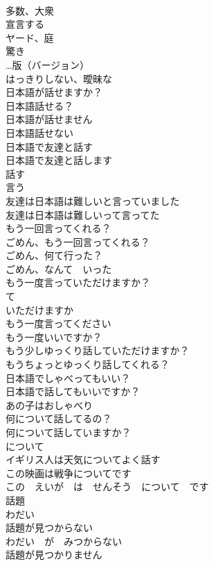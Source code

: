 \documentclass[8pt]{extreport}
\begin{document}
\begin{CJK}{UTF8}{min}
\\	多数、大衆	
\\	宣言する	
\\	ヤード、庭	
\\	驚き	
\\	…版（バージョン）	
\\	はっきりしない、曖昧な	
\\	日本語が話せますか？	
\\	日本語話せる？	
\\	日本語が話せません	
\\	日本語話せない	
\\	日本語で友達と話す	
\\	日本語で友達と話します	
\\	話す	
\\	言う	
\\	友達は日本語は難しいと言っていました	
\\	友達は日本語は難しいって言ってた	
\\	もう一回言ってくれる？	
\\	ごめん、もう一回言ってくれる？	
\\	ごめん、何て行った？	
\\	ごめん、なんて　いった
\\	もう一度言っていただけますか？	
\\	て
\\	いただけますか 
\\	もう一度言ってください	
\\	もう一度いいですか？	
\\	もう少しゆっくり話していただけますか？	
\\	もうちょっとゆっくり話してくれる？	
\\	日本語でしゃべってもいい？	
\\	日本語で話してもいいですか？	
\\	あの子はおしゃべり	
\\	何について話してるの？	
\\	何について話していますか？	
\\	について 
\\	イギリス人は天気についてよく話す	
\\	この映画は戦争についてです	
\\	この　えいが　は　せんそう　について　です
\\	話題	
\\	わだい	
\\	話題が見つからない	
\\	わだい　が　みつからない
\\	話題が見つかりません	

\end{CJK}
\end{document}
